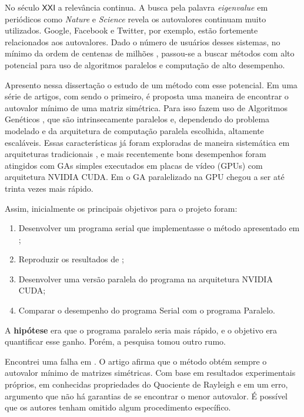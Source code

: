 	No século $\mathsf{XXI}$ a relevância continua. A busca pela palavra \emph{eigenvalue} em periódicos como \emph{Nature} e \emph{Science} revela os autovalores continuam muito utilizados. Google, Facebook e Twitter, por exemplo, estão fortemente relacionados aos autovalores. Dado o número de usuários desses sistemas, no mínimo da ordem de centenas de milhões \cite{twitter2010}, passou-se a buscar métodos com alto potencial para uso de algoritmos paralelos e computação de alto desempenho.
	
	Apresento nessa dissertação o estudo de um método com esse potencial. Em uma série de artigos, com \cite{metodo2004} sendo o primeiro, é proposta uma maneira de encontrar o autovalor mínimo de uma matriz simétrica. Para isso fazem uso de Algoritmos Genéticos \cite{Mitchell98}, que são intrinsecamente paralelos \cite{Linden2008} e, dependendo do problema modelado e da arquitetura de computação paralela escolhida, altamente escaláveis. Essas características já foram exploradas de maneira sistemática em arquiteturas tradicionais \cite{Cantu-Paz2000}, e mais recentemente bons desempenhos foram atingidos com GAs simples executados em placas de vídeo (GPUs) com arquitetura NVIDIA CUDA. Em \cite{onemaxNaGPU} o GA paralelizado na GPU chegou a ser até trinta vezes mais rápido.

	Assim, inicialmente os principais objetivos para o projeto foram:
	
	\begin{enumerate}
		\item Desenvolver um programa serial que implementasse o método apresentado em \cite{metodo2004};
		
		\item Reproduzir os resultados de \cite{metodo2004};
		
		\item Desenvolver uma versão paralela do programa na arquitetura NVIDIA CUDA;
		
		\item Comparar o desempenho do programa Serial com o programa Paralelo.
	\end{enumerate}
	
	A \textbf{hipótese} era que o programa paralelo seria mais rápido, e o objetivo era quantificar esse ganho. Porém, a pesquisa tomou outro rumo.
	
	Encontrei uma falha em \cite{metodo2004}. O artigo afirma que o método obtém sempre o autovalor mínimo de matrizes simétricas. Com base em resultados experimentais próprios, em conhecidas propriedades do Quociente de Rayleigh e em um erro, argumento que não há garantias de se encontrar o menor autovalor. É possível que os autores tenham omitido algum procedimento específico.
	
